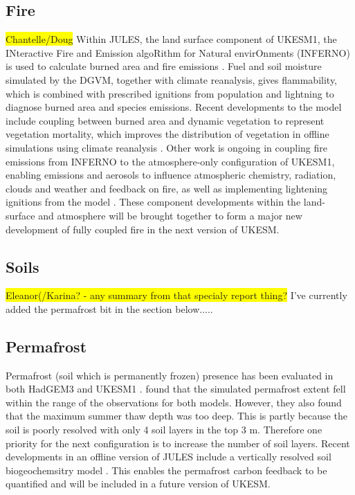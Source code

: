 \documentclass[bg, manuscript]{copernicus}
\newcommand{\hilight}[1]{\colorbox{yellow}{#1}}
\begin{document}
\subsection{Fire}
\hilight{Chantelle/Doug}
Within JULES, the land surface component of UKESM1, the INteractive Fire and Emission algoRithm for Natural envirOnments (INFERNO) is used to calculate burned area and fire emissions \citep{Mangeon2016}. Fuel and soil moisture simulated by the DGVM, together with climate reanalysis, gives flammability, which is combined with prescribed ignitions from population and lightning to diagnose burned area and species emissions. Recent developments to the model include coupling between burned area and dynamic vegetation to represent vegetation mortality, which improves the distribution of vegetation in offline simulations using climate reanalysis \citep{Burton2019}. Other work is ongoing in coupling fire emissions from INFERNO to the atmosphere-only configuration of UKESM1, enabling emissions and aerosols to influence atmospheric chemistry, radiation, clouds and weather and feedback on fire, as well as implementing lightening ignitions from the model \citep{Joao2020}. These component developments within the land-surface and atmosphere will be brought together to form a major new development of fully coupled fire in the next version of UKESM. 

\subsection{Soils}
\hilight{Eleanor(/Karina? - any summary from that specialy report thing?}  I've currently added the permafrost bit in the section below.....

\subsection{Permafrost}
Permafrost (soil which is permanently frozen) presence has been evaluated in both HadGEM3 and UKESM1 \citep{Sellar2019-bo,burke2020evaluating}. \cite{burke2020evaluating} found that the simulated permafrost extent fell within the range of the observations for both models. However, they also found that the maximum summer thaw depth was too deep. This is partly because the soil is poorly resolved with only 4 soil layers in the top 3 m. Therefore one priority for the next configuration is to increase the number of soil layers. Recent developments in an offline version of JULES include a vertically resolved soil biogeochemsitry model \citep{wiltshire2020jules,burke2017vertical}. This enables the permafrost carbon feedback to be quantified \citep{burke2017quantifying} and will be included in a future version of UKESM.
\end{document}

